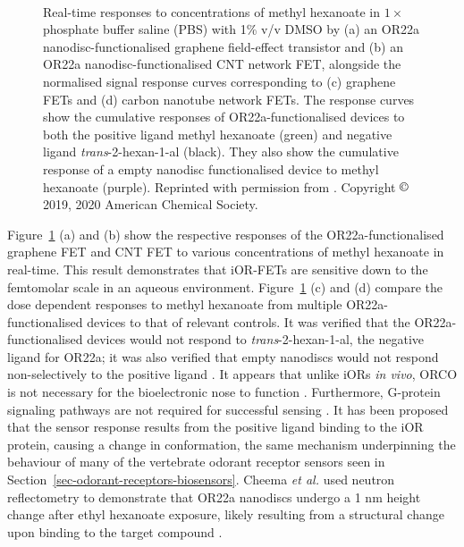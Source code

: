\documentclass[
  a4paper,
]{scrbook}
\begin{document}
\begin{figure}
\begin{minipage}[t]{0.45\linewidth}
{{}

}

\end{minipage}%
%
\begin{minipage}[t]{0.01\linewidth}

{\centering 

~

}

\end{minipage}%

\caption[Real-time sensing behaviour of graphene and carbon nanotube
network field-effect transistors before and after OR22a
functionalisation.]{\label{fig-iOR-sensing-literature}Real-time
responses to concentrations of methyl hexanoate in \(1 \times\)
phosphate buffer saline (PBS) with 1\% v/v DMSO by (a) an OR22a
nanodisc-functionalised graphene field-effect transistor and (b) an
OR22a nanodisc-functionalised CNT network FET, alongside the normalised
signal response curves corresponding to (c) graphene FETs and (d) carbon
nanotube network FETs. The response curves show the cumulative responses
of OR22a-functionalised devices to both the positive ligand methyl
hexanoate (green) and negative ligand \emph{trans}-2-hexan-1-al (black).
They also show the cumulative response of a empty nanodisc
functionalised device to methyl hexanoate (purple). Reprinted with
permission from \autocite{Murugathas2019a,Murugathas2020}. Copyright
\(\copyright\) 2019, 2020 American Chemical Society.}

\end{figure}

Figure~\ref{fig-iOR-sensing-literature} (a) and (b) show the respective
responses of the OR22a-functionalised graphene FET and CNT FET to
various concentrations of methyl hexanoate in real-time. This result
demonstrates that iOR-FETs are sensitive down to the femtomolar scale in
an aqueous environment. Figure~\ref{fig-iOR-sensing-literature} (c) and
(d) compare the dose dependent responses to methyl hexanoate from
multiple OR22a-functionalised devices to that of relevant controls. It
was verified that the OR22a-functionalised devices would not respond to
\emph{trans}-2-hexan-1-al, the negative ligand for OR22a; it was also
verified that empty nanodiscs would not respond non-selectively to the
positive ligand \autocite{Murugathas2019a,Murugathas2020}. It appears
that unlike iORs \emph{in vivo}, ORCO is not necessary for the
bioelectronic nose to function
\autocite{Murugathas2019a,Murugathas2020,Khadka2019,Cheema2021}.
Furthermore, G-protein signaling pathways are not required for
successful sensing \autocite{Sato2014}. It has been proposed that the
sensor response results from the positive ligand binding to the iOR
protein, causing a change in conformation, the same mechanism
underpinning the behaviour of many of the vertebrate odorant receptor
sensors seen in Section~\ref{sec-odorant-receptors-biosensors}. Cheema
\emph{et al.} used neutron reflectometry to demonstrate that OR22a
nanodiscs undergo a 1 nm height change after ethyl hexanoate exposure,
likely resulting from a structural change upon binding to the target
compound \autocite{Cheema2021}.
\end{document}
